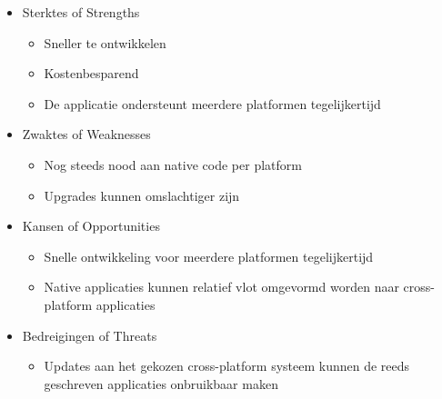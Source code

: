 \begin{itemize}
    \item Sterktes of Strengths
    \begin{itemize}
        \item Sneller te ontwikkelen
        \item Kostenbesparend
        \item De applicatie ondersteunt meerdere platformen tegelijkertijd
    \end{itemize}
    \item Zwaktes of Weaknesses
    \begin{itemize}
        \item Nog steeds nood aan native code per platform
        \item Upgrades kunnen omslachtiger zijn
    \end{itemize}
    \item Kansen of Opportunities
    \begin{itemize}
        \item Snelle ontwikkeling voor meerdere platformen tegelijkertijd
        \item Native applicaties kunnen relatief vlot omgevormd worden naar cross-platform applicaties
    \end{itemize}
    \item Bedreigingen of Threats
    \begin{itemize}
        \item Updates aan het gekozen cross-platform systeem kunnen de reeds geschreven applicaties onbruikbaar maken
    \end{itemize}
\end{itemize}


\subsection{}
\label{sec:SVZnative}

\subsection{}
\label{sec:SVZcrossplatform}

\section{}
\label{sec:SVZmultiplatform}


